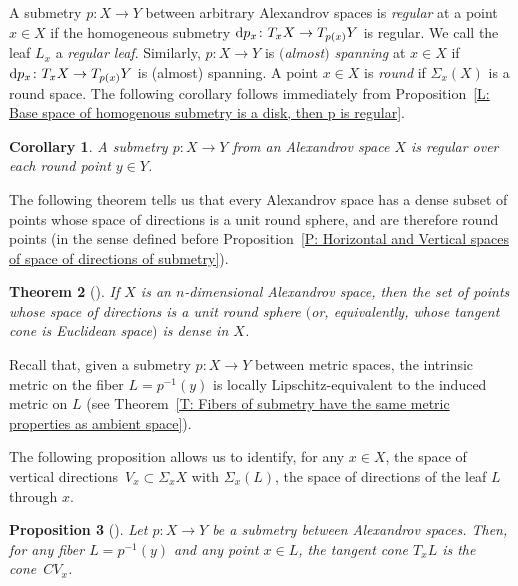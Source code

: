 \documentclass[pdftex]{sigma}
\numberwithin{equation}{section}
\newtheorem{thm}{Theorem}[section]
\newtheorem{cor}[thm]{Corollary}
\newtheorem{prop}[thm]{Proposition}
\theoremstyle{definition}
\begin{document}
A submetry $p\colon X\to Y$ between arbitrary Alexandrov spaces is \emph{regular} at a point $x\in X$ if the homogeneous submetry ${\rm d}p_x\colon T_xX \to T_{p(x)}Y$ is regular. We call the leaf $L_x$ a \emph{regular leaf}. Similarly, $p\colon X\to Y$ is \emph{$($almost$)$ spanning} at $x\in X$ if ${\rm d}p_x\colon T_xX \to T_{p(x)}Y$ is (almost) spanning. A point $x\in X$ is \emph{round} if $\Sigma_x(X)$ is a round space. The following corollary follows immediately from Proposition~\ref{L: Base space of homogenous submetry is a disk, then p is regular}.

\begin{cor}\label{L: submetry over a manifold point is regular}
A submetry $p\colon X \to Y$ from an Alexandrov space $X$ is regular over each round point $y\in Y$.
\end{cor}



The following theorem tells us that every Alexandrov space has a dense subset of points whose space of directions is a unit round sphere, and are therefore round points (in the sense defined before Proposition~\ref{P: Horizontal and Vertical spaces of space of directions of submetry}).



\begin{thm}[]
\label{T:geometrically.regular.points.are.dense}
If $X$ is an $n$-dimensional Alexandrov space, then
the set of points whose space of directions is a unit round sphere $($or, equivalently, whose tangent cone is Euclidean space$)$ is dense in $X$.
\end{thm}


Recall that, given a submetry $p\colon X\to Y$ between metric spaces, the intrinsic metric on the fiber $L = p^{-1}(y)$ is locally Lipschitz-equivalent to the induced metric on $L$ (see Theorem~\ref{T: Fibers of submetry have the same metric properties as ambient space}).


The following proposition allows us to identify, for any $x\in X$, the space of vertical directions~${V_x\subset \Sigma_xX}$ with $\Sigma_x(L)$, the space of di\-rections of the leaf $L$ through $x$.



\begin{prop}[]
\label{P: Tangent space to leaf is cone of vertical space}
Let $p\colon X\to Y$ be a submetry between Alexandrov spaces. Then, for any fiber $L = p^{-1}(y)$ and any point $x\in L$, the tangent cone $T_x L $ is the cone~$CV_x$.
\end{prop}
\end{document}
